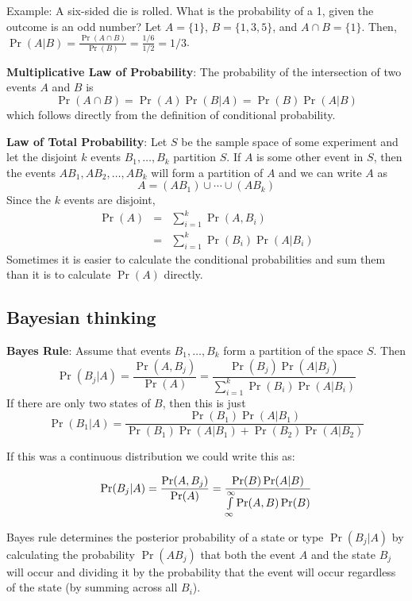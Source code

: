 \documentclass[11pt]{article}
\newcommand{\beqa}{\begin{eqnarray}}
\newcommand{\eeqa}{\end{eqnarray}}
\newcommand{\non}{\nonumber}
\newcommand{\lint}{\int\limits}
\begin{document}
\item Example:  A six-sided die is rolled.  What is the probability of a
1, given the outcome is an odd number?  Let $A=\{ 1 \}$, $B=\{ 1, 3, 5
\}$, and $A\cap B=\{ 1 \}$.  Then, $\Pr(A|B)=\frac{\Pr(A\cap
B)}{\Pr(B)}=\frac{1/6}{1/2}=1/3$.

\item {\bf Multiplicative Law of Probability}: The probability of the
intersection of two events $A$ and $B$ is $$\Pr(A\cap
B)=\Pr(A)\Pr(B|A)=\Pr(B)\Pr(A|B)$$ which follows directly from the
definition of conditional probability.

\item {\bf Law of Total Probability}:  Let $S$ be the sample space of
some experiment and let the disjoint $k$ events $B_1,\ldots,B_k$
partition $S$.  If $A$ is some other event in $S$, then the events
$AB_1, AB_2, \ldots, AB_k$ will form a partition of $A$ and we can write
$A$ as $$A=(AB_1)\cup\cdots\cup (AB_k)$$  Since the $k$ events are
disjoint,
\beqa
\Pr(A)&=&\sum\limits_{i=1}^k \Pr(A,B_i)\non\\
      &=&\sum\limits_{i=1}^k \Pr(B_i)\Pr(A|B_i)\non
\eeqa
Sometimes it is easier to calculate the conditional probabilities and
sum them than it is to calculate $\Pr(A)$ directly.

\subsection{Bayesian thinking}

\item {\bf Bayes Rule}: Assume that events $B_1,\ldots,B_k$ form a
partition of the space $S$.  Then $$\Pr(B_j|A)= \frac{\Pr(A, B_j)}
{\Pr(A)} = \frac{\Pr(B_j)
\Pr(A|B_j)}{\sum\limits_{i=1}^k \Pr(B_i)\Pr(A|B_i)}$$
If there are only two states of $B$, then this is just
$$\Pr(B_1|A)=\frac{\Pr(B_1)\Pr(A|B_1)}
{\Pr(B_1)\Pr(A|B_1)+\Pr(B_2)\Pr(A|B_2)}$$


\item If this was a continuous distribution we could write this as:

$$\Pr(B_j|A)= \frac{\Pr(A, B_j)}
{\Pr(A)} = \frac{\Pr(B)
\Pr(A|B)}{\lint\limits_{\infty}^\infty \Pr(A, B)\Pr(B)}$$


\item Bayes rule  determines the posterior probability of a state or
type  $\Pr(B_j|A)$ by calculating the probability $\Pr(A B_j)$ that both
the event $A$ and the state $B_j$ will occur and dividing it by the
probability that the event will occur regardless of the state (by
summing across all $B_i$).
\end{document}
